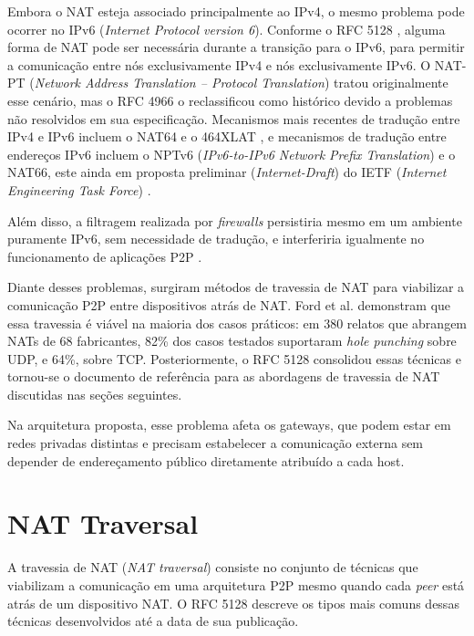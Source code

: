 Embora o NAT esteja associado principalmente ao IPv4, o mesmo problema pode ocorrer no IPv6 (\textit{Internet Protocol version 6}). Conforme o RFC 5128 \citep{rfc5128}, alguma forma de NAT pode ser necessária durante a transição para o IPv6, para permitir a comunicação entre nós exclusivamente IPv4 e nós exclusivamente IPv6. O NAT-PT (\textit{Network Address Translation -- Protocol Translation}) \citep{RFC2766} tratou originalmente esse cenário, mas o RFC 4966 \citep{RFC4966} o reclassificou como histórico devido a problemas não resolvidos em sua especificação. Mecanismos mais recentes de tradução entre IPv4 e IPv6 incluem o NAT64 \citep{rfc6146} e o 464XLAT \citep{rfc6877}, e mecanismos de tradução entre endereços IPv6 incluem o NPTv6 (\textit{IPv6-to-IPv6 Network Prefix Translation}) \citep{rfc6296} e o NAT66, este ainda em proposta preliminar (\textit{Internet-Draft}) do IETF (\textit{Internet Engineering Task Force}) \citep{draft-mrw-nat66}.

Além disso, a filtragem realizada por \textit{firewalls} persistiria mesmo em um ambiente puramente IPv6, sem necessidade de tradução, e interferiria igualmente no funcionamento de aplicações P2P \citep{rfc5128}.

Diante desses problemas, surgiram métodos de travessia de NAT para viabilizar a comunicação P2P entre dispositivos atrás de NAT. Ford et al. \citep{ford2005peer} demonstram que essa travessia é viável na maioria dos casos práticos: em 380 relatos que abrangem NATs de 68 fabricantes, 82\% dos casos testados suportaram \textit{hole punching} sobre UDP, e 64\%, sobre TCP. Posteriormente, o RFC 5128 \citep{rfc5128} consolidou essas técnicas e tornou-se o documento de referência para as abordagens de travessia de NAT discutidas nas seções seguintes.

Na arquitetura proposta, esse problema afeta os gateways, que podem estar em redes privadas distintas e precisam estabelecer a comunicação externa sem depender de endereçamento público diretamente atribuído a cada host.

\section{NAT Traversal}
\label{sec:nat_traversal}

A travessia de NAT (\textit{NAT traversal}) consiste no conjunto de técnicas que viabilizam a comunicação em uma arquitetura P2P mesmo quando cada \textit{peer} está atrás de um dispositivo NAT. O RFC 5128 \citep{rfc5128} descreve os tipos mais comuns dessas técnicas desenvolvidos até a data de sua publicação.

